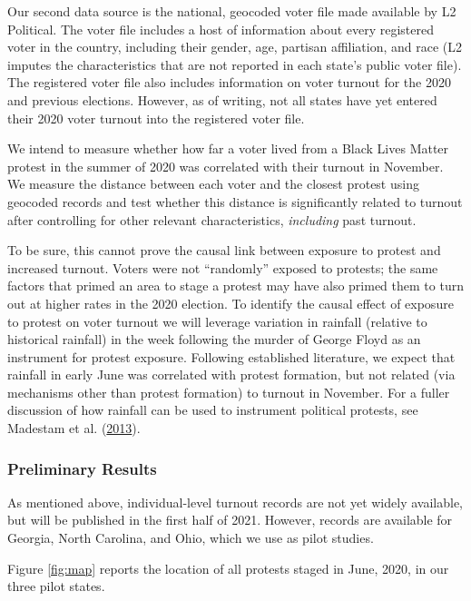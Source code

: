 \documentclass[
  12pt,
]{article}
\begin{document}
Our second data source is the national, geocoded voter file made available by L2 Political. The voter file includes a host of information about every registered voter in the country, including their gender, age, partisan affiliation, and race (L2 imputes the characteristics that are not reported in each state's public voter file). The registered voter file also includes information on voter turnout for the 2020 and previous elections. However, as of writing, not all states have yet entered their 2020 voter turnout into the registered voter file.

We intend to measure whether how far a voter lived from a Black Lives Matter protest in the summer of 2020 was correlated with their turnout in November. We measure the distance between each voter and the closest protest using geocoded records and test whether this distance is significantly related to turnout after controlling for other relevant characteristics, \emph{including} past turnout.

To be sure, this cannot prove the causal link between exposure to protest and increased turnout. Voters were not ``randomly'' exposed to protests; the same factors that primed an area to stage a protest may have also primed them to turn out at higher rates in the 2020 election. To identify the causal effect of exposure to protest on voter turnout we will leverage variation in rainfall (relative to historical rainfall) in the week following the murder of George Floyd as an instrument for protest exposure. Following established literature, we expect that rainfall in early June was correlated with protest formation, but not related (via mechanisms other than protest formation) to turnout in November. For a fuller discussion of how rainfall can be used to instrument political protests, see Madestam et al. (\protect\hyperlink{ref-Madestam2013}{2013}).

\hypertarget{preliminary-results}{%
\subsubsection*{Preliminary Results}\label{preliminary-results}}

As mentioned above, individual-level turnout records are not yet widely available, but will be published in the first half of 2021. However, records are available for Georgia, North Carolina, and Ohio, which we use as pilot studies.

Figure \ref{fig:map} reports the location of all protests staged in June, 2020, in our three pilot states.
\end{document}
